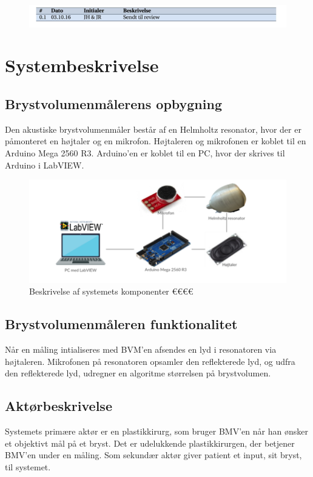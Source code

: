 			\begin{figure}[htb]
				\centering
				\includegraphics[width=5in]{versionshisv01.png}
			\end{figure}
		
	\section{Systembeskrivelse}

		\subsection{Brystvolumenmålerens opbygning} \label{subsec:BVMopb}
		
		
		Den akustiske brystvolumenmåler består af en Helmholtz resonator, hvor der er påmonteret en højtaler og en mikrofon. Højtaleren og mikrofonen er koblet til en Arduino Mega 2560 R3. Arduino'en er koblet til en PC, hvor der skrives til Arduino i LabVIEW. \\ 
		
		\begin{figure}[htb]
			\centering
			\includegraphics[width=5in]{systembeskrivelse}
			\caption{Beskrivelse af systemets komponenter €€€€}
			\label{system}
		\end{figure}
	
		\subsection{Brystvolumenmåleren funktionalitet}
		Når en måling intialiseres med BVM'en afsendes en lyd i resonatoren via højtaleren. Mikrofonen på resonatoren opsamler den reflekterede lyd, og udfra den reflekterede lyd, udregner en algoritme størrelsen på brystvolumen. 
	
		\subsection{Aktørbeskrivelse}
		Systemets primære aktør er en plastikkirurg, som bruger BMV'en når han ønsker et objektivt mål på et bryst. Det er udelukkende plastikkirurgen, der  betjener BMV'en under en måling. Som sekundær aktør giver patient et input, sit bryst, til systemet. 
	
